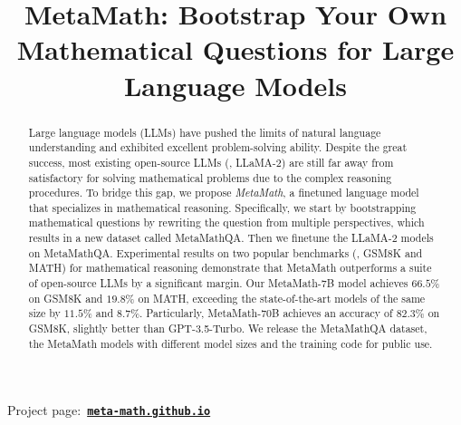 \title{MetaMath: Bootstrap Your Own Mathematical Questions for Large Language Models}



\doparttoc %
\faketableofcontents
\maketitle


\vspace{-16mm}
\begin{center}
          \fontsize{9pt}{\baselineskip}\selectfont
          {Project page:}~\tt\href{https://meta-math.github.io/}{\textbf{meta-math.github.io}}
         \vspace{3mm}
\end{center}

\vspace{-3mm}
\begin{abstract}
\vspace{-2.5mm}

    Large language models (LLMs) have pushed the limits of natural language understanding and exhibited excellent problem-solving ability. Despite the great success, most existing open-source LLMs (\eg, LLaMA-2) are still far away from satisfactory for solving mathematical problems due to the complex reasoning procedures. To bridge this gap, we propose \emph{MetaMath}, a finetuned language model that specializes in mathematical reasoning. Specifically, we start by bootstrapping mathematical questions by rewriting the question from multiple perspectives, which results in a new dataset called {MetaMathQA}. Then we finetune the LLaMA-2 models on MetaMathQA.
    Experimental results on two popular benchmarks (\ie, GSM8K and MATH) for mathematical reasoning 
    demonstrate that 
    MetaMath outperforms a suite of open-source LLMs by a significant margin.  Our MetaMath-7B model achieves $66.5\%$ on GSM8K and $19.8\%$ on MATH, exceeding the state-of-the-art models of the same size by $11.5\%$ and $8.7\%$.
    Particularly,
    {MetaMath-70B} achieves an accuracy of $82.3\%$ on {GSM8K}, slightly better than {GPT-3.5-Turbo}.
    We release the {MetaMathQA} dataset, the {MetaMath} models with different model sizes and the training code for public use.
\end{abstract}
 
